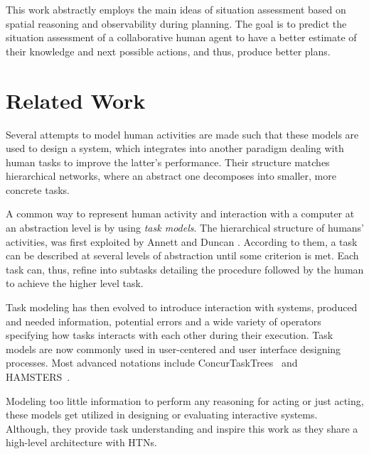 \documentclass[letterpaper]{article} %
\begin{document}

This work abstractly employs the main ideas of situation assessment based on spatial reasoning and observability during planning. The goal is to predict the situation assessment of a collaborative human agent to have a better estimate of their knowledge and next possible actions, and thus, produce better plans.



\section{Related Work}

Several attempts to model human activities are made such that these models are used to design a system, which integrates into another paradigm dealing with human tasks to improve the latter's performance. Their structure matches hierarchical networks, where an abstract one decomposes into smaller, more concrete tasks.

A common way to represent human activity and interaction with a computer at an abstraction level is by using \textit{task models}. The hierarchical structure of humans' activities, was first exploited by Annett and Duncan \citeyear{annett1967task}. According to them, a task can be described at several levels of abstraction until some criterion is met. Each task can, thus, refine into subtasks detailing the procedure followed by the human to achieve the higher level task.

Task modeling has then evolved to introduce interaction with systems, produced and needed information, potential errors and a wide variety of operators specifying how tasks interacts with each other during their execution. Task models are now commonly used in user-centered and user interface designing processes. Most advanced notations include {\sc ConcurTaskTrees}~\cite{paterno2004concurtasktrees} and {\sc HAMSTERS}~\cite{martinie2019analysing}.

Modeling too little information to perform any reasoning for acting or just acting, these models get utilized in designing or evaluating interactive systems. Although, they provide task understanding and inspire this work as they share a high-level architecture with HTNs.
\end{document}
